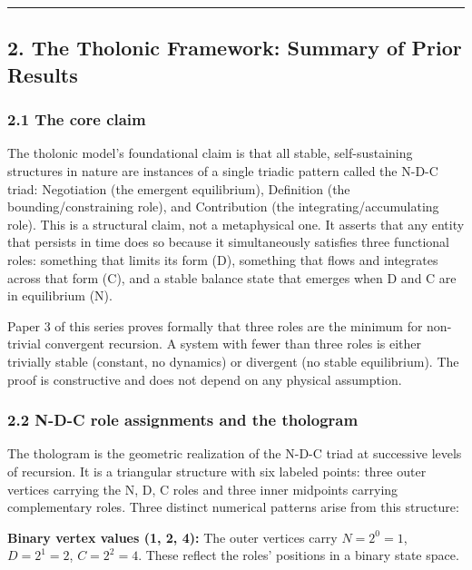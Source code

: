 \documentclass[
  11pt,
  letterpaper,
]{article}
\begin{document}
\begin{center}\rule{0.5\linewidth}{0.5pt}\end{center}

\subsection{2. The Tholonic Framework: Summary of Prior
Results}\label{the-tholonic-framework-summary-of-prior-results}

\subsubsection{2.1 The core claim}\label{the-core-claim}

The tholonic model's foundational claim is that all stable,
self-sustaining structures in nature are instances of a single triadic
pattern called the N-D-C triad: Negotiation (the emergent equilibrium),
Definition (the bounding/constraining role), and Contribution (the
integrating/accumulating role). This is a structural claim, not a
metaphysical one. It asserts that any entity that persists in time does
so because it simultaneously satisfies three functional roles: something
that limits its form (D), something that flows and integrates across
that form (C), and a stable balance state that emerges when D and C are
in equilibrium (N).

Paper 3 of this series proves formally that three roles are the minimum
for non-trivial convergent recursion. A system with fewer than three
roles is either trivially stable (constant, no dynamics) or divergent
(no stable equilibrium). The proof is constructive and does not depend
on any physical assumption.

\subsubsection{2.2 N-D-C role assignments and the
thologram}\label{n-d-c-role-assignments-and-the-thologram}

The thologram is the geometric realization of the N-D-C triad at
successive levels of recursion. It is a triangular structure with six
labeled points: three outer vertices carrying the N, D, C roles and
three inner midpoints carrying complementary roles. Three distinct
numerical patterns arise from this structure:

\textbf{Binary vertex values (1, 2, 4):} The outer vertices carry
\(N = 2^0 = 1\), \(D = 2^1 = 2\), \(C = 2^2 = 4\). These reflect the
roles' positions in a binary state space.
\end{document}
